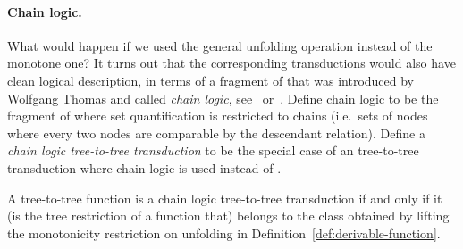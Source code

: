 \paragraph*{Chain logic.} What would happen if we used the general  unfolding operation instead of the monotone one? It turns out that the corresponding transductions would also have clean logical description, in terms of a fragment of \mso that was introduced by  Wolfgang Thomas and called \emph{chain logic}, see~\cite[Section 2]{thomas1992} or~\cite[Section 2.5.3]{bojanczykDecidablePropertiesTree2004}. Define chain logic to be the fragment of \mso where set quantification is restricted to chains (i.e.~sets of nodes where every two nodes are comparable by  the descendant relation). Define a \emph{chain logic tree-to-tree transduction} to be the special case of an \mso tree-to-tree transduction where chain logic is used instead of \mso. 

\begin{theorem}\label{thm:chain-transductions}
    A tree-to-tree function is a chain logic tree-to-tree transduction if and only if it (is the tree restriction of a function that)  belongs to the class obtained by lifting the monotonicity restriction on unfolding in   Definition~\ref{def:derivable-function}. 
\end{theorem}



